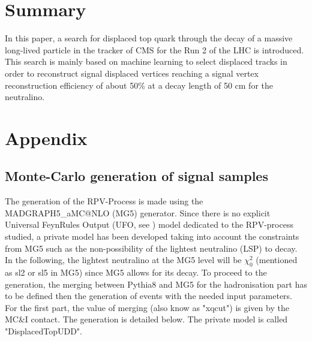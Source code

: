 \documentclass{cernatlasnote}
\begin{document}
\newpage
\section{Summary}

In this paper, a search for displaced top quark through the decay of a massive long-lived particle in the tracker of CMS for the Run 2 of the LHC is introduced. This search is mainly based on machine learning to select displaced tracks in order to reconstruct signal displaced vertices reaching a signal vertex reconstruction efficiency of about 50\% at a decay length of 50 cm for the neutralino.

\label{SEC: SUM}

\newpage
\section{Appendix}
\label{SEC: APP}

\subsection{Monte-Carlo generation of signal samples}
\label{APP: GEN}
The generation of the RPV-Process is made using the MADGRAPH5\_aMC@NLO (MG5) generator. Since there is no explicit Universal FeynRules Output (UFO, see \cite{UFO}) model dedicated to the RPV-process studied, a private model has been developed taking into account the constraints from MG5 such as the non-possibility of the lightest neutralino (LSP) to decay. In the following, the lightest neutralino at the MG5 level will be $\chi^2_{0}$ (mentioned as sl2 or sl5 in MG5) since MG5 allows for its decay. To proceed to the generation, the merging between Pythia8 \cite{bierlich2022comprehensive} and MG5 for the hadronisation part has to be defined then the generation of events with the needed input parameters.
For the first part, the value of merging (also know as "xqcut") is given by the MC\&I contact. The generation is detailed below. The private model is called "DisplacedTopUDD".
\end{document}
